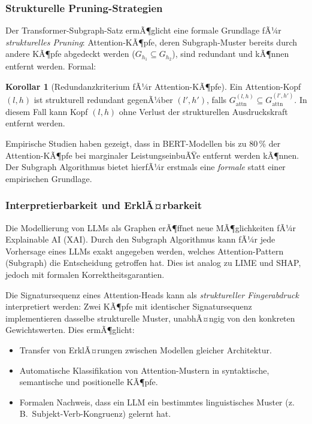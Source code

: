 ﻿\documentclass[a4paper,12pt]{article}
\theoremstyle{definition}
\newtheorem{korollar}{Korollar}
\begin{document}
\subsubsection{Strukturelle Pruning-Strategien}

Der Transformer-Subgraph-Satz ermÃ¶glicht eine formale Grundlage fÃ¼r
\textit{strukturelles Pruning}: Attention-KÃ¶pfe, deren Subgraph-Muster
bereits durch andere KÃ¶pfe abgedeckt werden ($G_{h_1} \subseteq G_{h_2}$),
sind redundant und kÃ¶nnen entfernt werden. Formal:

\begin{korollar}[Redundanzkriterium fÃ¼r Attention-KÃ¶pfe]
	Ein Attention-Kopf $(l, h)$ ist strukturell redundant gegenÃ¼ber
	$(l', h')$, falls $G_{\mathrm{attn}}^{(l,h)} \subseteq G_{\mathrm{attn}}^{(l',h')}$.
	In diesem Fall kann Kopf $(l, h)$ ohne Verlust der strukturellen
	Ausdruckskraft entfernt werden.
\end{korollar}

Empirische Studien \cite{voita2019analyzing} haben gezeigt, dass in
BERT-Modellen bis zu 80\,\% der Attention-KÃ¶pfe bei marginaler LeistungseinbuÃŸe
entfernt werden kÃ¶nnen. Der Subgraph Algorithmus bietet hierfÃ¼r erstmals
eine \textit{formale} statt einer empirischen Grundlage.

\subsubsection{Interpretierbarkeit und ErklÃ¤rbarkeit}

Die Modellierung von LLMs als Graphen erÃ¶ffnet neue MÃ¶glichkeiten fÃ¼r
Explainable AI (XAI). Durch den Subgraph Algorithmus kann fÃ¼r jede
Vorhersage eines LLMs exakt angegeben werden, welches Attention-Pattern
(Subgraph) die Entscheidung getroffen hat. Dies ist analog zu LIME
\cite{ribeiro2016} und SHAP, jedoch mit formalen Korrektheitsgarantien.

Die Signatursequenz eines Attention-Heads kann als \textit{struktureller
Fingerabdruck} interpretiert werden: Zwei KÃ¶pfe mit identischer Signatursequenz
implementieren dasselbe strukturelle Muster, unabhÃ¤ngig von den konkreten
Gewichtswerten. Dies ermÃ¶glicht:
\begin{itemize}
	\item Transfer von ErklÃ¤rungen zwischen Modellen gleicher Architektur.
	\item Automatische Klassifikation von Attention-Mustern in syntaktische,
	      semantische und positionelle KÃ¶pfe.
	\item Formalen Nachweis, dass ein LLM ein bestimmtes linguistisches
	      Muster (z.\,B.\ Subjekt-Verb-Kongruenz) gelernt hat.
\end{itemize}
\end{document}
